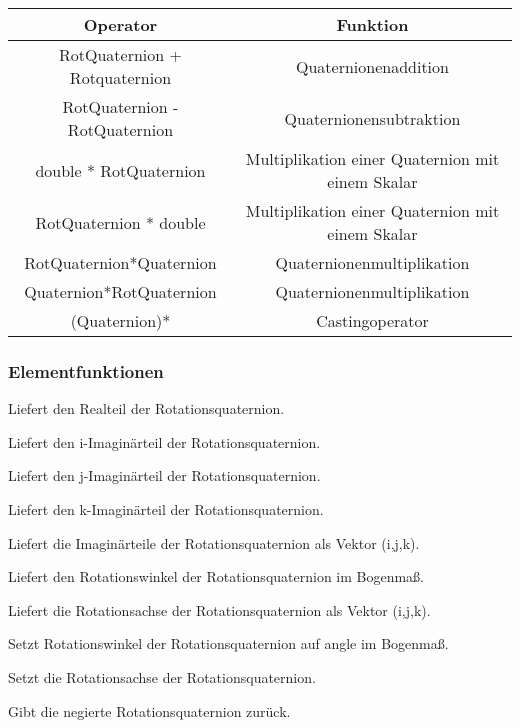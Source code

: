 \begin{tabular}{|c|c|}
\hline
Operator & Funktion\\ 
\hline
RotQuaternion + Rotquaternion & Quaternionenaddition\\
\hline
RotQuaternion - RotQuaternion & Quaternionensubtraktion\\
\hline
double * RotQuaternion & Multiplikation einer Quaternion mit einem Skalar\\
\hline
RotQuaternion * double & Multiplikation einer Quaternion mit einem Skalar\\
\hline
RotQuaternion*Quaternion & Quaternionenmultiplikation\\
\hline
Quaternion*RotQuaternion & Quaternionenmultiplikation\\
\hline
(Quaternion)* & Castingoperator
\end{tabular}

\subsubsection{Elementfunktionen}
\descr
{
Liefert den Realteil der Rotationsquaternion.
}

\descr
{
Liefert den i-Imaginärteil der Rotationsquaternion.
}

\descr
{
Liefert den j-Imaginärteil der Rotationsquaternion.
}

\descr
{
Liefert den k-Imaginärteil der Rotationsquaternion.
}

\descr
{
Liefert die Imaginärteile der Rotationsquaternion als Vektor (i,j,k).
}

\descr
{
Liefert den Rotationswinkel der Rotationsquaternion im Bogenmaß.
}

\descr
{
Liefert die Rotationsachse der Rotationsquaternion als Vektor (i,j,k).
}

\descr
{
Setzt Rotationswinkel der Rotationsquaternion auf angle im Bogenmaß.
}

\descr
{
Setzt die Rotationsachse der Rotationsquaternion.
}

\descr
{
Gibt die negierte Rotationsquaternion zurück.
}

